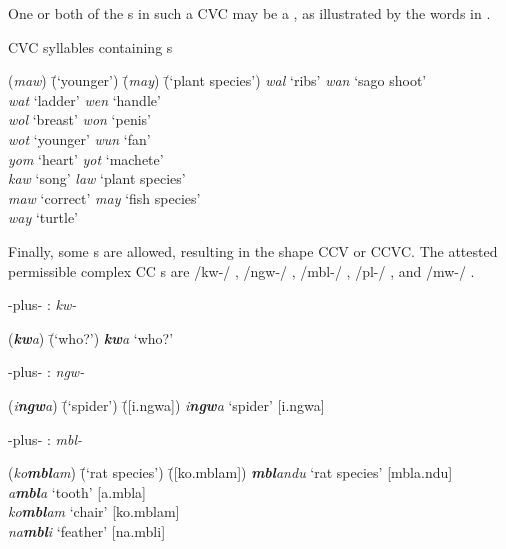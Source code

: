 One or both of the s in such a CVC  may be a , as illustrated by the words in .

\ea%
    \label{ex:phon:59a}
          CVC syllables containing s
    \begin{tabbing}
    {(\textit{maw})} \= {(‘younger’)}   \=    {(\textit{may})} \= {(‘plant species’)}\kill
 \textit{wal}  \> ‘ribs’    \>         \textit{wan} \> ‘sago shoot’\\
 \textit{wat}  \> ‘ladder’   \>       \textit{wen} \> ‘handle’\\
 \textit{wol}  \> ‘breast’    \>      \textit{won} \> ‘penis’\\
 \textit{wot}  \> ‘younger’    \>      \textit{wun} \> ‘fan’\\
 \textit{yom} \>  ‘heart’    \>        \textit{yot}  \>  ‘machete’\\
 \textit{kaw} \>  ‘song’     \>       \textit{law}  \>  ‘plant species’\\
 \textit{maw} \>  ‘correct’    \>      \textit{may} \> ‘fish species’\\
 \textit{way} \>  ‘turtle’
 \end{tabbing}
\z


Finally, some s are allowed, resulting in the  shape CCV or CCVC. The attested permissible complex CC s are /kw-/ , /ngw-/ , /mbl-/ , /pl-/ , and /mw-/ .

\ea%
    \label{ex:phon:60}
{-plus- : \textit{kw-}}\\
\begin{tabbing}
{(\textit{\textbf{kw}a})} \= {(‘who?’)}\kill
{\textit{\textbf{kw}a}} \> {‘who?’}
\end{tabbing}
\z

\ea%
    \label{ex:phon:60a}
{-plus- : \textit{ngw-}}\\
\begin{tabbing}
{(\textit{i\textbf{ngw}a})} \= {(‘spider’)} \= {([i.ngwa])}\kill
{\textit{i\textbf{ngw}a}} \> {‘spider’} \> {[i.ngwa]}
\end{tabbing}
\z

\ea%
    \label{ex:phon:60b}
{ -plus- : \textit{mbl-}}\\
\begin{tabbing}
{(\textit{ko\textbf{mbl}am})} \= {(‘rat species’)} \= {([ko.mblam])}\kill
{\textit{\textbf{mbl}andu}} \> {‘rat species’} \> {[mbla.ndu]}\\
{\textit{a\textbf{mbl}a}} \> {‘tooth’} \> {[a.mbla]}\\
{\textit{ko\textbf{mbl}am}} \> {‘chair’} \> {[ko.mblam]}\\
{\textit{na\textbf{mbl}i}} \> {‘feather’} \> {[na.mbli]}
\end{tabbing}
\z

